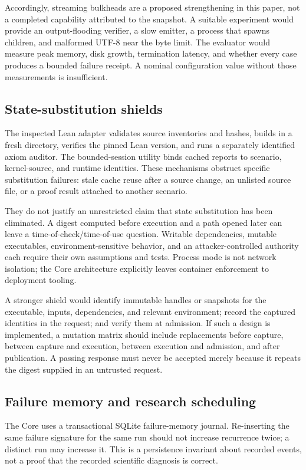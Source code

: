 \documentclass[11pt,reqno]{amsart}
\theoremstyle{definition}
\begin{document}
Accordingly, streaming bulkheads are a proposed strengthening in this paper,
not a completed capability attributed to the snapshot. A suitable experiment
would provide an output-flooding verifier, a slow emitter, a process that
spawns children, and malformed UTF-8 near the byte limit. The evaluator
would measure peak memory, disk growth, termination latency, and whether
every case produces a bounded failure receipt. A nominal configuration
value without those measurements is insufficient.

\subsection{State-substitution shields}
The inspected Lean adapter validates source inventories and hashes, builds in
a fresh directory, verifies the pinned Lean version, and runs a separately
identified axiom auditor. The bounded-session utility binds cached reports to
scenario, kernel-source, and runtime identities. These mechanisms obstruct
specific substitution failures: stale cache reuse after a source change,
an unlisted source file, or a proof result attached to another scenario.

They do not justify an unrestricted claim that state substitution has been
eliminated. A digest computed before execution and a path opened later can
leave a time-of-check/time-of-use question. Writable dependencies, mutable
executables, environment-sensitive behavior, and an attacker-controlled
authority each require their own assumptions and tests. Process mode is not
network isolation; the Core architecture explicitly leaves container
enforcement to deployment tooling.

A stronger shield would identify immutable handles or snapshots for the
executable, inputs, dependencies, and relevant environment; record the
captured identities in the request; and verify them at admission. If such a
design is implemented, a mutation matrix should include replacements before
capture, between capture and execution, between execution and admission, and
after publication. A passing response must never be accepted merely because
it repeats the digest supplied in an untrusted request.

\subsection{Failure memory and research scheduling}
The Core uses a transactional SQLite failure-memory journal. Re-inserting the
same failure signature for the same run should not increase recurrence twice;
a distinct run may increase it. This is a persistence invariant about recorded
events, not a proof that the recorded scientific diagnosis is correct.
\end{document}
